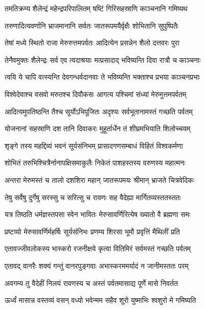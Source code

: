 \twolineshloka
{तमतिक्रम्य शैलेन्द्रं महेन्द्रपरिपालितम्}
{षष्टिं गिरिसहस्राणि काञ्चनानि गमिष्यथ} %

\twolineshloka
{तरुणादित्यवर्णानि भ्राजमानानि सर्वतः}
{जातरूपमयैर्वृक्षैः शोभितानि सुपुष्पितैः} %

\twolineshloka
{तेषां मध्ये स्थितो राजा मेरुरुत्तमपर्वतः}
{आदित्येन प्रसन्नेन शैलो दत्तवरः पुरा} %

\twolineshloka
{तेनैवमुक्तः शैलेन्द्रः सर्व एव त्वदाश्रयाः}
{मत्प्रसादाद् भविष्यन्ति दिवा रात्रौ च काञ्चनाः} %

\twolineshloka
{त्वयि ये चापि वत्स्यन्ति देवगन्धर्वदानवाः}
{ते भविष्यन्ति भक्ताश्च प्रभया काञ्चनप्रभाः} %

\twolineshloka
{विश्वेदेवाश्च वसवो मरुतश्च दिवौकसः}
{आगत्य पश्चिमां संध्यां मेरुमुत्तमपर्वतम्} %

\twolineshloka
{आदित्यमुपतिष्ठन्ति तैश्च सूर्योऽभिपूजितः}
{अदृश्यः सर्वभूतानामस्तं गच्छति पर्वतम्} %

\twolineshloka
{योजनानां सहस्राणि दश तानि दिवाकरः}
{मुहूर्तार्धेन तं शीघ्रमभियाति शिलोच्चयम्} %

\twolineshloka
{शृङ्गे तस्य महद्दिव्यं भवनं सूर्यसंनिभम्}
{प्रासादगणसम्बाधं विहितं विश्वकर्मणा} %

\twolineshloka
{शोभितं तरुभिश्चित्रैर्नानापक्षिसमाकुलैः}
{निकेतं पाशहस्तस्य वरुणस्य महात्मनः} %

\twolineshloka
{अन्तरा मेरुमस्तं च तालो दशशिरा महान्}
{जातरूपमयः श्रीमान् भ्राजते चित्रवेदिकः} %

\twolineshloka
{तेषु सर्वेषु दुर्गेषु सरस्सु च सरित्सु च}
{रावणः सह वैदेह्या मार्गितव्यस्ततस्ततः} %

\twolineshloka
{यत्र तिष्ठति धर्मज्ञस्तपसा स्वेन भावितः}
{मेरुसावर्णिरित्येष ख्यातो वै ब्रह्मणा समः} %

\twolineshloka
{प्रष्टव्यो मेरुसावर्णिर्महर्षिः सूर्यसंनिभः}
{प्रणम्य शिरसा भूमौ प्रवृत्तिं मैथिलीं प्रति} %

\twolineshloka
{एतावज्जीवलोकस्य भास्करो रजनीक्षये}
{कृत्वा वितिमिरं सर्वमस्तं गच्छति पर्वतम्} %

\twolineshloka
{एतावद् वानरैः शक्यं गन्तुं वानरपुङ्गवाः}
{अभास्करममर्यादं न जानीमस्ततः परम्} %

\twolineshloka
{अवगम्य तु वैदेहीं निलयं रावणस्य च}
{अस्तं पर्वतमासाद्य पूर्णे मासे निवर्तत} %

\twolineshloka
{ऊर्ध्वं मासान्न वस्तव्यं वसन् वध्यो भवेन्मम}
{सहैव शूरो युष्माभिः श्वशुरो मे गमिष्यति} %

